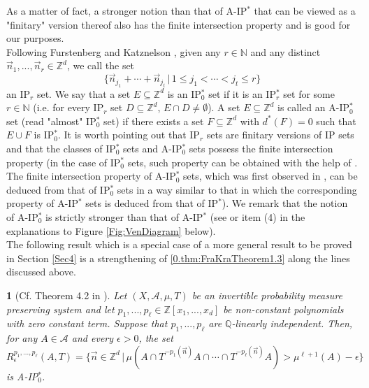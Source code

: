 \documentclass[11pt,american,preprint]{elsarticle}
\numberwithin{equation}{section}
\theoremstyle{plain}
\newtheorem{thm}{\protect\theoremname}[section]
\theoremstyle{plain*}
\theoremstyle{plain}
\theoremstyle{plain*}
\theoremstyle{plain}
\theoremstyle{plain*}
\theoremstyle{remark}
\theoremstyle{remark*}
\theoremstyle{remark}
\theoremstyle{remark*}
\theoremstyle{remark}
\theoremstyle{remark*}
\theoremstyle{plain}
\theoremstyle{definition}
\theoremstyle{plain}
\theoremstyle{plain} %
\providecommand{\theoremname}{Theorem}
\newcommand{\N}{\mathbb{N}}
\newcommand{\Q}{\mathbb{Q}}
\newcommand{\Z}{\mathbb{Z}}
\begin{document}
As a matter of fact, a  stronger notion than that of A-IP$^*$ that can be viewed as a  "finitary" version thereof  also has the finite intersection property and is good for our purposes.\\
 Following Furstenberg and Katznelson \cite{FKIPSzemerediLong}, given any $r\in\N$ and any  distinct $\vec n_1,...,\vec n_r\in\Z^d$, we call the set 
 $$\{\vec n_{j_1}+\cdots+\vec n_{j_t}\,|\,1\leq j_1<\cdots<j_t\leq r\}$$
 an IP$_r$ set.  We say that  a set $E\subseteq \Z^d$ is an IP$_0^*$ set if it is an IP$_r^*$ set for some $r\in\N$ (i.e. for every IP$_r$ set $D\subseteq \Z^d$, $E\cap D\neq\emptyset$). A set $E\subseteq \Z^d$ is called an A-IP$_0^*$ set (read "almost" IP$_0^*$ set) if there exists  a set $F\subseteq \Z^d$ with $d^*(F)=0$
such that $E\cup F$ is IP$_0^*$. It is worth pointing out that IP$_r$ sets are finitary versions of IP sets and that the classes of IP$_0^*$ sets  and A-IP$_0^*$ sets   possess the finite intersection property (in the case of IP$_0^*$ sets, such property can be obtained with the help of \cite[Proposition 2.5]{BDonaldRobertsonIP_r}. The finite intersection property of A-IP$_0^*$ sets, which was first observed in \cite[p. 502] {AlmostIPBerLeib}, can be deduced from that of IP$_0^*$ sets in a way similar to that in which the corresponding property of A-IP$^*$ sets is deduced from that of IP$^*$). We remark that the notion of A-IP$_0^*$ is strictly stronger than that of A-IP$^*$ (see \cite[p. 505]{AlmostIPBerLeib} or item (4) in the explanations to Figure \ref{Fig:VenDiagram} below).\\ 
The following result which is a special case of a more general result to be proved in Section \ref{Sec4} is a strengthening of \cref{0.thm:FraKraTheorem1.3} along the lines discussed above. 
\begin{thm}[Cf. Theorem 4.2 in \cite{AlmostIPBerLeib}]\label{0.thm:BerLeibTheorem4.2} Let $(X,\mathcal A,\mu,T)$ be an invertible  probability measure preserving system and let $p_1,...,p_\ell\in\Z[x_1,...,x_d]$ be non-constant polynomials with zero constant term. Suppose that $p_1,...,p_\ell$ are $\Q$-linearly independent. Then, for any $A\in\mathcal A$ and every $\epsilon>0$, the set 
\begin{equation}\label{0.eq:LArgeBerLeibmanIntersection}
R_\epsilon^{p_1,...,p_\ell}(A,T)=\{\vec n\in\Z^d\,|\,\mu(A\cap T^{-p_1(\vec n)}A\cap \cdots \cap T^{-p_\ell(\vec n)}A)>\mu^{\ell+1}(A)-\epsilon \}
\end{equation}
is \rm{A-IP$_0^*$}.
\end{thm}
\end{document}
